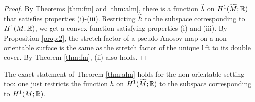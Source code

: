 \begin{proof}
  By Theorems \ref{thm:fm} and \ref{thm:alm}, there is a function $\widetilde{h}$ on $H^1(\widetilde{M}; \mathbb{R})$ that satisfies properties (i)-(iii). Restricting $\widetilde{h}$
  to the subspace corresponding to $H^1(M; \mathbb{R})$, we get a convex function satisfying properties
  (i) and (iii). By Proposition \ref{prop:2}, the stretch factor of a pseudo-Anosov
  map on a non-orientable surface is the same as the stretch factor of the unique lift to its
  double cover. By Theorem \ref{thm:fm}, (ii) also holds.
\end{proof}

The exact statement of Theorem \ref{thm:alm} holds for the non-orientable setting too: one just
restricts the function $h$ on $H^1(\widetilde{M}; \mathbb{R})$ to the subspace corresponding to $H^1(M; \mathbb{R})$.